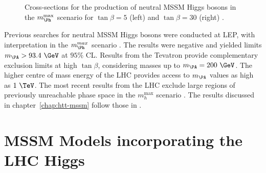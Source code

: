\begin{figure}[htbp]
\caption{Cross-sections for the production of neutral MSSM Higgs bosons in the 
$m_{\Ph}^{\text{max}}$ scenario for $\tan\beta=5$ (left) and $\tan\beta=30$
(right) \cite{Heinemeyer:2013tqa}.}
\label{fig:mhmaxXSs}
\end{figure}

Previous searches for neutral \ac{MSSM} Higgs bosons were conducted at LEP, with
interpretation in the $m_{\Ph}^{max}$ scenario \cite{Schael:2006cr}.
The results were negative and yielded limits $m_{\PA} > 93.4~\GeV$ at $95\%$ CL.  
Results from the Tevatron \cite{Benjamin:2010xb} provide complementary exclusion 
limits at high $\tan\beta$, considering masses up to $m_{\PA}=200~\GeV$. The
higher centre of mass energy of the LHC provides access to $m_{\PA}$ values as
high as $1~\TeV$. The most recent results from the LHC exclude large regions of
previously unreachable phase space in the $m_{h}^{\text{max}}$ scenario
\cite{Aad:2014vgg,HIG-13-021}. The results discussed in
chapter~\ref{chap:htt-mssm} follow those in \cite{HIG-13-021}.

\section{MSSM Models incorporating the LHC Higgs}
\label{sec:mssmbenchmarks}

